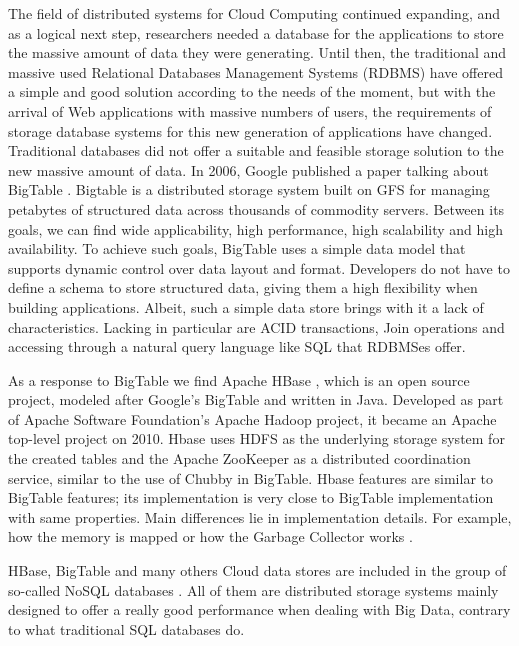 The field of distributed systems for Cloud Computing continued expanding, and as a logical next step, researchers needed a database for the applications to store the massive amount of data they were generating. Until then, the traditional and massive used Relational Databases Management Systems (RDBMS) have offered a simple and good solution according to the needs of the moment, but with the arrival of Web applications with massive numbers of users, the requirements of storage database systems for this new generation of applications have changed. Traditional databases did not offer a suitable and feasible storage solution to the new massive amount of data. In 2006, Google published a paper talking about BigTable \cite{chang2008bigtable}. Bigtable is a distributed storage system built on GFS for managing petabytes of structured data across thousands of commodity servers. Between its goals, we can find wide applicability, high performance, high scalability and high availability. To achieve such goals, BigTable uses a simple data model that supports dynamic control over data layout and format. Developers do not have to define a schema to store structured data, giving them a high flexibility when building applications. Albeit, such a simple data store brings with it a lack of characteristics. Lacking in particular are ACID transactions, Join operations and accessing through a natural query language like SQL that RDBMSes offer.
\par
As a response to BigTable we find Apache HBase \cite{ApacheHBase}, which is an open source project, modeled after Google's BigTable and written in Java. Developed as part of Apache Software Foundation's Apache Hadoop project, it became an Apache top-level project on 2010. Hbase uses HDFS as the underlying storage system for the created tables and the Apache ZooKeeper as a distributed coordination service, similar to the use of Chubby \cite{burrows2006chubby} in BigTable. Hbase features are similar to BigTable features; its implementation is very close to BigTable implementation with same properties. Main differences lie in implementation details. For example, how the memory is mapped or how the Garbage Collector works \cite {samar2011scalable}.
\par
HBase, BigTable and many others Cloud data stores are included in the group of so-called NoSQL databases \cite{NoSQLdatabases}. All of them are distributed storage systems mainly designed to offer a really good performance when dealing with Big Data, contrary to what traditional SQL databases do. 

\bigskip
{}
\bigskip


